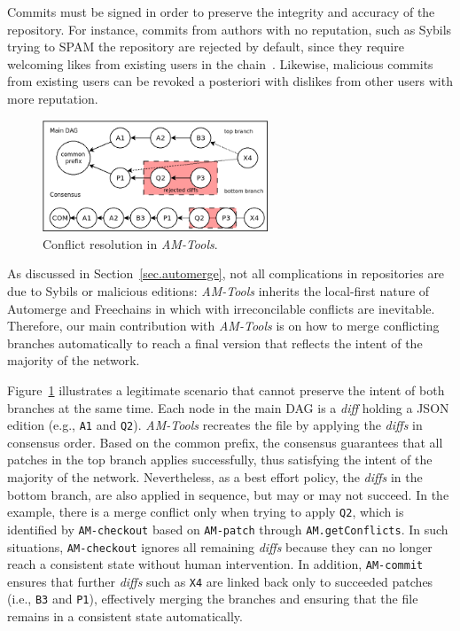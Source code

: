 \documentclass[12pt]{article}
\newcommand{\AMT}      {\emph{AM-Tools}\xspace}
\newcommand{\code}[1]  {\texttt{\footnotesize{#1}}}
\newcommand{\ampatch}    {\code{AM-patch}\xspace}
\newcommand{\amcheckout} {\code{AM-checkout}\xspace}
\newcommand{\amcommit}   {\code{AM-commit}\xspace}
\begin{document}
Commits must be signed in order to preserve the integrity and accuracy of the
repository.
For instance, commits from authors with no reputation, such as Sybils trying to
SPAM the repository are rejected by default, since they require welcoming likes
from existing users in the chain~\cite{fcs.sbseg20}.
Likewise, malicious commits from existing users can be revoked a posteriori
with dislikes from other users with more reputation.

\begin{figure}
    \includegraphics[width=0.6\textwidth]{conflicts.png}
    \caption{Conflict resolution in \AMT.}
    \label{fig.conflicts}
\end{figure}

As discussed in Section~\ref{sec.automerge}, not all complications in
repositories are due to Sybils or malicious editions:
\AMT inherits the local-first nature of Automerge and Freechains in which
with irreconcilable conflicts are inevitable.
%
Therefore, our main contribution with \AMT is on how to merge conflicting
branches automatically to reach a final version that reflects the intent of the
majority of the network.

Figure~\ref{fig.conflicts} illustrates a legitimate scenario that cannot
preserve the intent of both branches at the same time.
Each node in the main DAG is a \emph{diff} holding a JSON edition (e.g.,
\code{A1} and \code{Q2}).
\AMT recreates the file by applying the \emph{diffs} in consensus order.
Based on the common prefix, the consensus guarantees that all patches in the
top branch applies successfully, thus satisfying the intent of the majority of
the network.
Nevertheless, as a best effort policy, the \emph{diffs} in the bottom branch,
are also applied in sequence, but may or may not succeed.
In the example, there is a merge conflict only when trying to apply \code{Q2},
which is identified by \amcheckout based on \ampatch through
\code{AM.getConflicts}.
%
In such situations, \amcheckout ignores all remaining \emph{diffs} because they
can no longer reach a consistent state without human intervention.
In addition, \amcommit ensures that further \emph{diffs} such as \code{X4} are
linked back only to succeeded patches (i.e., \code{B3} and \code{P1}),
effectively merging the branches and ensuring that the file remains in a
consistent state automatically.
\end{document}
